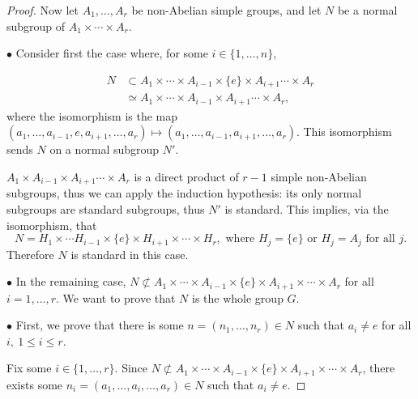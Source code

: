 \documentclass[11pt,a4paper]{article}
\begin{document}
\begin{proof}
Now let $A_1, \ldots,A_r$ be non-Abelian simple groups, and let $N$ be a normal subgroup of $A_1\times \cdots \times A_{r}$.

\item[$\bullet$]  Consider first the case where, for some $i \in \{1,\ldots,n\}$,

\begin{align*}
N &\subset A_1\times \cdots \times A_{i-1} \times \{e\} \times A_{i+1} \cdots \times A_r \\
    &\simeq   A_1\times \cdots \times A_{i-1}  \times A_{i+1}\cdots \times A_r,
\end{align*}
where the isomorphism is the map $(a_1,\ldots,a_{i-1},e,a_{i+1},\ldots,a_r) \mapsto (a_1,\ldots,a_{i-1},a_{i+1},\ldots,a_r)$. This isomorphism sends $N$ on a normal subgroup $N'$.

$ A_1\times A_{i-1}  \times A_{i+1}\cdots \times A_r$ is a direct product of $r-1$ simple non-Abelian subgroups, thus we can apply the induction hypothesis: its only normal subgroups are standard subgroups, thus $N'$ is standard. This implies, via the isomorphism, that 
$$N = H_1\times \cdots H_{i-1} \times \{e\} \times H_{i+1} \times \cdots \times H_r, \text{ where } H_j = \{e\} \text{ or } H_j = A_j \text{ for all } j.$$
Therefore $N$ is standard in this case.

\item[$\bullet$] In the remaining case,  $N \not \subset A_1\times \cdots \times A_{i-1} \times \{e\} \times A_{i+1}\times \cdots \times A_r $ for all $i=1,\ldots,r$. We want to prove that $N$ is the whole group $G$. 

\item[$\bullet$]  First, we prove that there is some $n=(n_1,\ldots,n_r) \in N$ such that $a_i \ne e$ for all $i,\ 1 \leq i \leq r$. 

Fix some $i \in \{1,\ldots,r\}$. Since $N \not \subset A_1\times \cdots \times A_{i-1} \times \{e\} \times A_{i+1}\times \cdots \times A_r $, there exists some
$n_i = (a_1,\ldots,a_i,\ldots,a_r) \in N$ such that $a_i \ne e$.


\end{proof}
\end{document}
